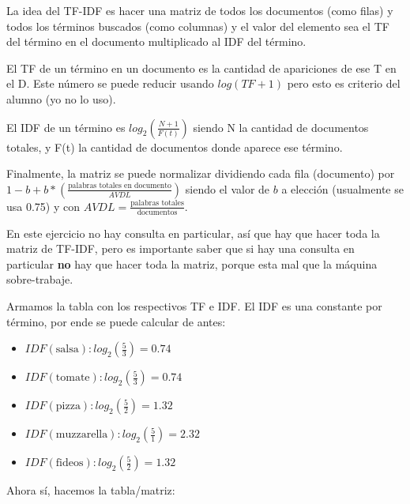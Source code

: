 \documentclass[a4paper]{article}
\begin{document}
    La idea del TF-IDF es hacer una matriz de todos los documentos (como filas) y todos los términos buscados (como columnas) y el valor del elemento sea el TF del término en el documento multiplicado al IDF del término.

    El TF de un término en un documento es la cantidad de apariciones de ese T en el D. Este número se puede reducir usando $log(TF+1)$ pero esto es criterio del alumno (yo no lo uso). 

    El IDF de un término es $log_2{(\frac{N+1}{F(t)})}$ siendo N la cantidad de documentos totales, y F(t) la cantidad de documentos donde aparece ese término.

    Finalmente, la matriz se puede normalizar dividiendo cada fila (documento) por $1-b+b*(\frac{\text{palabras totales en documento}}{AVDL})$ siendo el valor de $b$ a elección (usualmente se usa 0.75) y con $AVDL=\frac{\text{palabras totales}}{\text{documentos}}$.

    En este ejercicio no hay consulta en particular, así que hay que hacer toda la matriz de TF-IDF, pero es importante saber que si hay una consulta en particular \textbf{no} hay que hacer toda la matriz, porque esta mal que la máquina sobre-trabaje. 
    
    Armamos la tabla con los respectivos {\color{green}TF} e {\color{red}IDF}. El IDF es una constante por término, por ende se puede calcular de antes: 
    
    \begin{itemize}
        \item $IDF(\text{salsa}): log_2{(\frac{5}{3})} = 0.74$
        \item $IDF(\text{tomate}): log_2{(\frac{5}{3})} = 0.74$
        \item $IDF(\text{pizza}): log_2{(\frac{5}{2})} = 1.32$
        \item $IDF(\text{muzzarella}): log_2{(\frac{5}{1})} = 2.32$
        \item $IDF(\text{fideos}): log_2{(\frac{5}{2})} = 1.32$
    \end{itemize}

    Ahora sí, hacemos la tabla/matriz:
\end{document}

